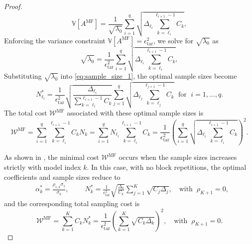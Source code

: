 \begin{proof}
%
\begin{equation*} \label{eq:MFMC_variance2}
    \mathbb{V}\left[A^{\text{MF}}\right] = \frac{1}{\sqrt{\lambda_0}}\sum_{i=1}^q\sqrt{\Delta_{\ell_i}\sum_{k=\ell_i}^{\ell_{i+1}-1} C_k},
\end{equation*}
%
Enforcing the variance constraint $\mathbb{V}[A^{\text{MF}}] = \epsilon_{\text{tar}}^2$, we solve for $\sqrt{\lambda_0}$ as
%
\[
\sqrt{\lambda_0}=\frac{1}{\epsilon_{\text{tar}}^2} \sum_{i=1}^{q} \sqrt{\Delta_{\ell_i}\sum_{k=\ell_i}^{\ell_{i+1}-1} C_{k}},
\]
%
Substituting $\sqrt{\lambda_0}$ into \eqref{eq:sample_size_1}, the optimal sample sizes become
%
\[
N_{\ell_i}^* = \frac{1}{\epsilon_{\text{tar}}^2}\sqrt{\frac{\Delta_{\ell_i}}{\sum_{k=\ell_i}^{\ell_{i+1}-1} C_{k}}}  \sum_{j=1}^{q} \sqrt{\Delta_{\ell_j}\sum_{k=\ell_j}^{\ell_{j+1}-1} C_{k}} \;\text{ for }\; i=1,\ldots,q.
\]
%
The total cost $\mathcal{W}^\text{MF}$ associated with these optimal sample sizes is
%
\begin{equation*}
\mathcal{W}^\text{MF} = \sum_{i=1}^q \sum_{k=\ell_i}^{\ell_{i+1}-1} C_k N_k = \sum_{i=1}^q N_{\ell_i}\sum_{k=\ell_i}^{\ell_{i+1}-1} C_k =\frac{1}{\epsilon_{\text{tar}}^2}\left(\sum_{i=1}^{q} \sqrt{\Delta_{\ell_i}\sum_{k=\ell_i}^{\ell_{i+1}-1} C_{k}}\right)^2.
\end{equation*}
%


As shown in \cite[Lemma~A.3]{PeWiGu:2016}, the minimal cost $\mathcal{W}^\text{MF}$ occurs when the sample sizes increases strictly with model index $k$. In this case, with no block repetitions, the optimal coefficients and sample sizes reduce to
%
\begin{align*}
    \label{eq:MFMC_SampleSize}
    &\alpha_k^*=\frac{\rho_{1,k}\sigma_1}{\sigma_k},\qquad \;N_k^*=\frac{1}{\epsilon_\text{tar}^2}\sqrt{\frac{\Delta_k}{C_k}}\sum_{j=1}^K\sqrt{C_j\Delta_j},\quad \text{with}\;\;\rho_{K+1}=0,
\end{align*}
%
and the corresponding total sampling cost is
%
\[
    \mathcal{W}^\text{MF} = \sum_{k=1}^K C_k N_k^* = \frac{1}{\epsilon_{\text{tar}}^2}\left(\sum_{k=1}^K\sqrt{C_k\Delta_k}\right)^2,\quad \text{with}\;\;\rho_{K+1}=0.
\]
%




\end{proof}
